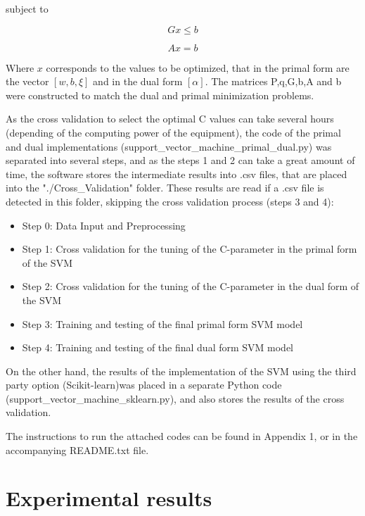 \documentclass[11pt,twocolumn,letterpaper]{article}
\begin{document}
subject to 

\begin{equation}
	Gx \leq b
\end{equation}

\begin{equation}
	Ax = b
\end{equation}

Where $x$ corresponds to the values to be optimized, that in the primal form are the vector $[w,b,\xi]$ and in the dual form $[\alpha]$. The matrices P,q,G,b,A and b were constructed to match the dual and primal minimization problems.

As the cross validation to select the optimal C values can take several hours (depending of the computing power of the equipment), the code of the primal and dual implementations (support\_vector\_machine\_primal\_dual.py) was separated into several steps, and as the steps 1 and 2 can take a great amount of time, the software stores the intermediate results into .csv files, that are placed into the "./Cross\_Validation" folder. These results are read if a .csv file is detected in this folder, skipping the cross validation process (steps 3 and 4):

\begin{itemize}
	\item Step 0: Data Input and Preprocessing
	\item Step 1: Cross validation for the tuning of the C-parameter in the primal form of  the SVM
	\item Step 2: Cross validation for the tuning of the C-parameter in the dual form of the SVM
	\item Step 3: Training and testing of the final primal form SVM model
	\item Step 4: Training and testing of the final dual form SVM model
\end{itemize}

On the other hand, the results of the implementation of the SVM using the third party option (Scikit-learn)was placed in a separate Python code (support\_vector\_machine\_sklearn.py), and also stores the results of the cross validation.

The instructions to run the attached codes can be found in Appendix 1, or in the accompanying README.txt file.

\section{Experimental results}
\end{document}
